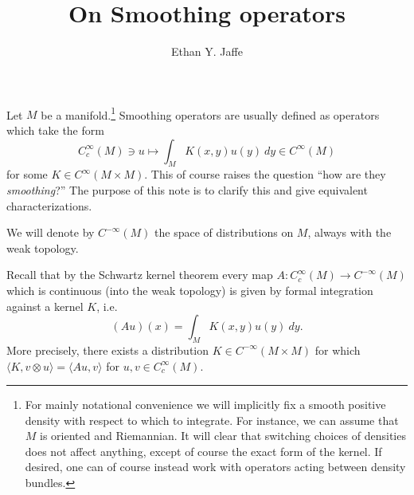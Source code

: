 \documentclass[12pt]{article}
\title{On Smoothing operators}
\author{Ethan Y. Jaffe}
\date{}
\begin{document}
\maketitle
\setcounter{section}{0}

Let $M$ be a manifold.\footnote{For mainly notational convenience we will implicitly fix a smooth positive density with respect to which to integrate. For instance, we can assume that $M$ is oriented and Riemannian. It will clear that switching choices of densities does not affect anything, except of course the exact form of the kernel. If desired, one can of course instead work with operators acting between density bundles.} Smoothing operators are usually defined as operators which take the form
\[C_c^\infty(M) \ni u \mapsto \int_M K(x,y)u(y)\ dy \in C^\infty(M)\]
for some $K \in C^\infty(M\times M)$. This of course raises the question ``how are they \emph{smoothing}?'' The purpose of this note is to clarify this and give equivalent characterizations.

We will denote by $C^{-\infty}(M)$ the space of distributions on $M$, always with the weak topology.

Recall that by the Schwartz kernel theorem every map $A:C_c^\infty(M) \to C^{-\infty}(M)$ which is continuous (into the weak topology) is given by formal integration against a kernel $K$, i.e.
\[(Au)(x) = \int_M K(x,y)u(y)\ dy.\] More precisely, there exists a distribution $K \in C^{-\infty}(M\times M)$ for which $\langle K,v\otimes u\rangle = \langle Au,v\rangle$ for $u,v \in C_c^\infty(M)$.
\end{document}

